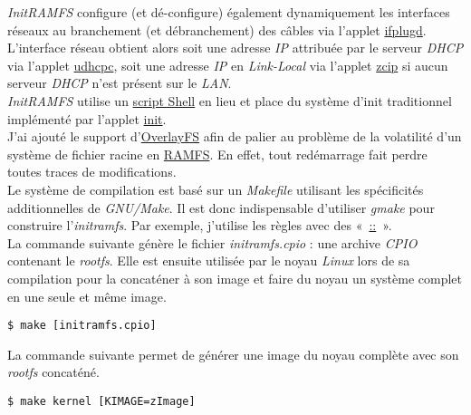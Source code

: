 \documentclass[a4paper]{article}
\begin{document}
\textit{InitRAMFS} configure (et dé-configure) également dynamiquement les interfaces réseaux au branchement (et débranchement) des câbles via l'applet \href{http://www.busybox.net/downloads/BusyBox.html#ifplugd}{ifplugd}. L'interface réseau obtient alors soit une adresse \textit{IP} attribuée par le serveur \textit{DHCP} via l'applet \href{http://www.busybox.net/downloads/BusyBox.html#udhcpc}{udhcpc}, soit une adresse \textit{IP} en \textit{Link-Local} via l'applet \href{http://www.busybox.net/downloads/BusyBox.html#zcip}{zcip} si aucun serveur \textit{DHCP} n'est présent sur le \textit{LAN}.\\

\textit{InitRAMFS} utilise un \href{https://github.com/gportay/initramfs/blob/master/packages-initramfs/ramfs/etc/init}{script Shell} en lieu et place du système d'init traditionnel implémenté par l'applet \href{http://www.busybox.net/downloads/BusyBox.html#init}{init}.\\

J'ai ajouté le support d'\href{https://www.kernel.org/doc/Documentation/filesystems/overlayfs.txt}{OverlayFS} afin de palier au problème de la volatilité d'un système de fichier racine en \href{https://fr.wikipedia.org/wiki/Ramfs}{RAMFS}. En effet, tout redémarrage fait perdre toutes traces de modifications.\\

Le système de compilation est basé sur un \textit{Makefile} utilisant les spécificités additionnelles de \textit{GNU/Make}. Il est donc indispensable d'utiliser \textit{gmake} pour construire l'\textit{initramfs}. Par exemple, j'utilise les règles avec des «~\href{https://www.gnu.org/software/make/manual/html_node/Double_002dColon.html}{::}~».\\

La commande suivante génère le fichier \textit{initramfs.cpio} : une archive \textit{CPIO} contenant le \textit{rootfs}. Elle est ensuite utilisée par le noyau \textit{Linux} lors de sa compilation pour la concaténer à son image et faire du noyau un système complet en une seule et même image.

\begin{verbatim}
$ make [initramfs.cpio]
\end{verbatim}

La commande suivante permet de générer une image du noyau complète avec son \textit{rootfs} concaténé.

\begin{verbatim}
$ make kernel [KIMAGE=zImage]
\end{verbatim}
\end{document}
